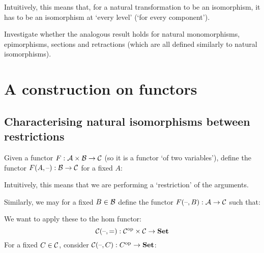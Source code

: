 Intuitively, this means that, for a natural transformation to be an isomorphism,
it has to be an isomorphism at `every level' (`for every component').

\begin{exercise}
Investigate whether the analogous result holds for natural monomorphisms,
epimorphisms, sections and retractions (which are all defined similarly to
natural isomorphisms).
\end{exercise}

\section{A construction on functors}

\subsection{Characterising natural isomorphisms between restrictions}

Given a functor $F: \mathcal{A} \times \mathcal{B} \to \mathcal{C}$ (so it is a functor
`of two variables'), define the functor $F (A, \text{--}): \mathcal{B} \to \mathcal{C}$
for a fixed $A$:

\begin{center}
\end{center}

Intuitively, this means that we are performing a `restriction' of the arguments.

Similarly, we may for a fixed $B \in \mathcal{B}$ define the functor
$F (\text{--}, B) : \mathcal{A} \to \mathcal{C}$ such that:

\begin{center}
\end{center}

We want to apply these to the hom functor:
\[ \mathcal{C} (\text{--}, \text{=}): {\mathcal{C}}^{\mathrm{op}} \times \mathcal{C} \to \mathbf {Set} \]
For a fixed $C \in \mathcal{C}$, consider
$\mathcal{C} (\text{--}, C): C^{\mathrm{op}} \to \mathbf {Set}$:

